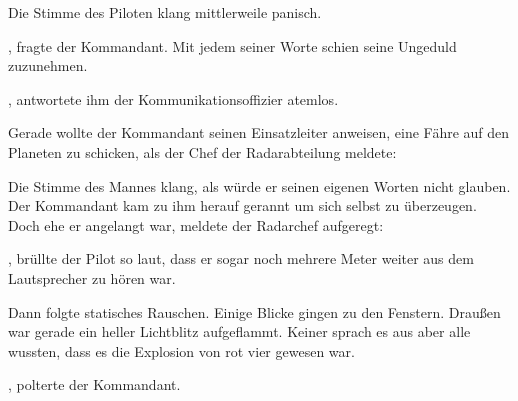 \par

Die Stimme des Piloten klang mittlerweile panisch. 

\par

, fragte der Kommandant. Mit jedem seiner Worte schien seine Ungeduld zuzunehmen.

\par

, antwortete ihm der Kommunikationsoffizier atemlos. 

\par

Gerade wollte der Kommandant seinen Einsatzleiter anweisen, eine Fähre auf den Planeten zu schicken, als der Chef der Radarabteilung meldete: 

\par

Die Stimme des Mannes klang, als würde er seinen eigenen Worten nicht glauben. Der Kommandant kam zu ihm herauf gerannt um sich selbst zu überzeugen. Doch ehe er angelangt war, meldete der Radarchef aufgeregt: 

\par

, brüllte der Pilot so laut, dass er sogar noch mehrere Meter weiter aus dem Lautsprecher zu hören war. 

\par

Dann folgte statisches Rauschen. Einige Blicke gingen zu den Fenstern. Draußen war gerade ein heller Lichtblitz aufgeflammt. Keiner sprach es aus aber alle wussten, dass es die Explosion von rot vier gewesen war.

\par

, polterte der Kommandant. 

